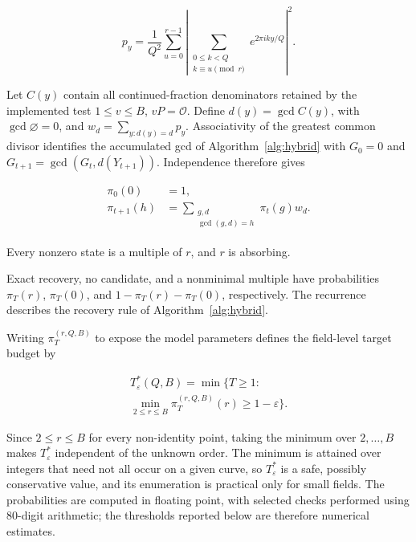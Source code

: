 \begin{revision}
\begin{equation}
     p_y=\frac{1}{Q^2}\sum_{u=0}^{r-1}
     \left|\sum_{\substack{0\leq k<Q\\ k\equiv u\pmod r}}
     e^{2\pi i k y/Q}\right|^2.
\end{equation}

Let $C(y)$ contain all continued-fraction denominators retained by the implemented test $1\leq v\leq B$, $vP=\mathcal O$. Define $d(y)=\gcd C(y)$, with $\gcd\varnothing=0$, and $w_d=\sum_{y:d(y)=d}p_y$. Associativity of the greatest common divisor identifies the accumulated gcd of Algorithm~\ref{alg:hybrid} with $G_0=0$ and $G_{t+1}=\gcd(G_t,d(Y_{t+1}))$. Independence therefore gives

\begin{equation}
    \label{eq:finite_gcd_recurrence}
    \begin{aligned}
        \pi_0(0)&=1,\\
        \pi_{t+1}(h)&=\sum_{\substack{g,d\\\gcd(g,d)=h}}
                    \pi_t(g)w_d.
    \end{aligned}
\end{equation}

Every nonzero state is a multiple of $r$, and $r$ is absorbing.

Exact recovery, no candidate, and a nonminimal multiple have probabilities $\pi_T(r)$, $\pi_T(0)$, and $1-\pi_T(r)-\pi_T(0)$, respectively. The recurrence describes the recovery rule of Algorithm~\ref{alg:hybrid}.

Writing $\pi_T^{(r,Q,B)}$ to expose the model parameters defines the field-level target budget by

\begin{equation}
    \begin{aligned}
        T_\varepsilon^*(Q,B)=\min\{T\geq1:\quad\\
        \min_{2\leq r\leq B}\pi_T^{(r,Q,B)}(r)\geq1-\varepsilon\}.
    \end{aligned}
\end{equation}

Since $2\leq r\leq B$ for every non-identity point, taking the minimum over $2,\ldots,B$ makes $T_\varepsilon^*$ independent of the unknown order. The minimum is attained over integers that need not all occur on a given curve, so $T_\varepsilon^*$ is a safe, possibly conservative value, and its enumeration is practical only for small fields. The probabilities are computed in floating point, with selected checks performed using 80-digit arithmetic; the thresholds reported below are therefore numerical estimates.


\end{revision}
